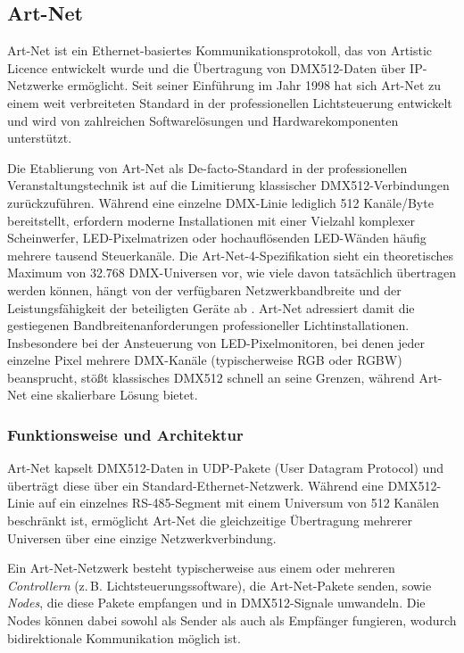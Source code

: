 \subsection{Art-Net}
\label{subsec:artnet}

Art-Net ist ein Ethernet-basiertes Kommunikationsprotokoll, das von Artistic Licence
entwickelt wurde und die Übertragung von DMX512-Daten über IP-Netzwerke ermöglicht.
Seit seiner Einführung im Jahr 1998 hat sich Art-Net zu einem weit verbreiteten Standard
in der professionellen Lichtsteuerung entwickelt und wird von zahlreichen
Softwarelösungen und Hardwarekomponenten unterstützt.

Die Etablierung von Art-Net als De-facto-Standard in der professionellen 
Veranstaltungstechnik ist auf die Limitierung klassischer DMX512-Verbindungen 
zurückzuführen. Während eine einzelne DMX-Linie lediglich 512 Kanäle/Byte bereitstellt, 
erfordern moderne Installationen mit einer Vielzahl komplexer Scheinwerfer, 
LED-Pixelmatrizen oder hochauflösenden LED-Wänden häufig mehrere tausend Steuerkanäle. 
Die Art-Net-4-Spezifikation sieht ein theoretisches Maximum von 32.768 DMX-Universen 
vor, wie viele davon tatsächlich übertragen werden können, hängt von der verfügbaren 
Netzwerkbandbreite und der Leistungsfähigkeit der beteiligten Geräte ab 
\cite{artnet4}. Art-Net adressiert damit die gestiegenen Bandbreitenanforderungen 
professioneller Lichtinstallationen. Insbesondere bei der Ansteuerung von LED-Pixelmonitoren, 
bei denen jeder einzelne Pixel mehrere DMX-Kanäle (typischerweise RGB oder RGBW) 
beansprucht, stößt klassisches DMX512 schnell an seine Grenzen, während Art-Net eine 
skalierbare Lösung bietet.

\subsubsection{Funktionsweise und Architektur}
\label{subsubsec:artnet-funktion}

Art-Net kapselt DMX512-Daten in UDP-Pakete (User Datagram Protocol) und überträgt diese
über ein Standard-Ethernet-Netzwerk. Während eine DMX512-Linie auf ein einzelnes
RS-485-Segment mit einem Universum von 512 Kanälen beschränkt ist, ermöglicht Art-Net die
gleichzeitige Übertragung mehrerer Universen über eine einzige Netzwerkverbindung.

Ein Art-Net-Netzwerk besteht typischerweise aus einem oder mehreren \textit{Controllern}
(z.\,B. Lichtsteuerungssoftware), die Art-Net-Pakete senden, sowie \textit{Nodes}, die
diese Pakete empfangen und in DMX512-Signale umwandeln. Die Nodes können dabei sowohl
als Sender als auch als Empfänger fungieren, wodurch bidirektionale Kommunikation
möglich ist.

